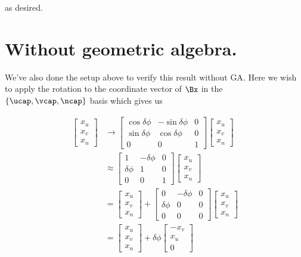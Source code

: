 as desired.

\section{Without geometric algebra.}

We've also done the setup above to verify this result without GA.  Here we wish to apply the rotation to the coordinate vector of $\Bx$ in the $\{\ucap, \vcap, \ncap\}$ basis which gives us

\begin{align*}
\begin{bmatrix}
x_u \\
x_v \\
x_n 
\end{bmatrix}
&\rightarrow 
\begin{bmatrix}
\cos\delta\phi & -\sin\delta\phi & 0 \\
\sin\delta\phi & \cos\delta\phi & 0 \\
0 & 0 & 1
\end{bmatrix}
\begin{bmatrix}
x_u \\
x_v \\
x_n 
\end{bmatrix} \\
&\approx
\begin{bmatrix}
1 & -\delta\phi & 0 \\
\delta\phi & 1 & 0 \\
0 & 0 & 1
\end{bmatrix}
\begin{bmatrix}
x_u \\
x_v \\
x_n 
\end{bmatrix} \\
&=
\begin{bmatrix}
x_u \\
x_v \\
x_n 
\end{bmatrix} 
+
\begin{bmatrix}
0 & -\delta\phi & 0 \\
\delta\phi & 0 & 0 \\
0 & 0 & 0
\end{bmatrix}
\begin{bmatrix}
x_u \\
x_v \\
x_n 
\end{bmatrix} \\
&=
\begin{bmatrix}
x_u \\
x_v \\
x_n 
\end{bmatrix} 
+
\delta\phi
\begin{bmatrix}
-x_v \\
x_u \\
0
\end{bmatrix} 
\end{align*}

